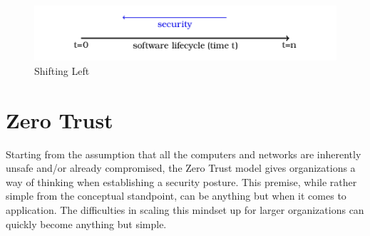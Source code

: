 \begin{figure}
	\centering
	\includegraphics{images/shift_left.png}
	\caption{Shifting Left}
	\label{shift}
\end{figure}

\section{Zero Trust}

\justifying
Starting from the assumption that all the computers and networks are inherently unsafe and/or already compromised, the
Zero Trust model gives organizations a way of thinking when establishing a security posture.\cite{zerotrust} This premise,
while rather simple from the conceptual standpoint, can be anything but when it comes to application. The difficulties in
scaling this mindset up for larger organizations can quickly become anything but simple.


